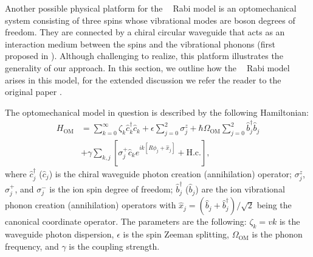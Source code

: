 \documentclass[reprint, aps, prx, amsmath, amssymb, longbibliography, superscriptaddress]{revtex4-2}
\DeclareMathOperator{\Zthree}{\mathbb{Z}_3}
\begin{document}
Another possible physical platform for the $\Zthree$ Rabi model is an optomechanical system consisting of three spins whose vibrational modes are boson degrees of freedom. They are connected by a chiral circular waveguide that acts as an interaction medium between the spins and the vibrational phonons (first proposed in \cite{sedov_chiral_2020}). Although challenging to realize, this platform illustrates the generality of our approach. In this section, we outline how the $\Zthree$ Rabi model arises in this model, for the extended discussion we refer the reader to the original paper \cite{sedov_chiral_2020}. 

The optomechanical model in question is described by the following Hamiltonian:
\begin{equation}
\label{eq:optomechanical-qb-ring}
\begin{aligned}
    H_{\text{OM}}&=\sum\limits_{k=0}^{\infty} \zeta_k \hat{c}_k^{\dagger} \hat{c}_k + 
 \epsilon \sum_{j=0}^2 \sigma_j^z + \hbar \Omega_{\text{OM}} \sum_{j=0}^2 \hat{b}_j^{\dagger} \hat{b}_j \\
    &+\gamma \sum_{k, j} \left[\sigma_j^{+} \hat{c}_k e^{i k\left[R \phi_j+\hat x_j\right]}+\mathrm {H.c.}\right] \text {, }
\end{aligned}   
\end{equation}
where $\hat c_j^\dagger$ ($\hat c_j$) is the chiral waveguide photon creation (annihilation) operator; $\sigma^z_j$,$\sigma_j^+$, and $\sigma_j^-$ is the ion spin degree of freedom; $\hat b^{\dagger}_j$ ($\hat b_j$) are the ion vibrational phonon creation (annihilation) operators with $\hat x_j = (\hat b_j + \hat b_j^{\dagger})/\sqrt{2}$ being the canonical coordinate operator. The parameters are the following: 
$\zeta_k = v k$ is the waveguide photon dispersion, $\epsilon$ is the spin Zeeman splitting, $\Omega_{\text{OM}}$ is the phonon frequency, and $\gamma$ is the coupling strength.
\end{document}
